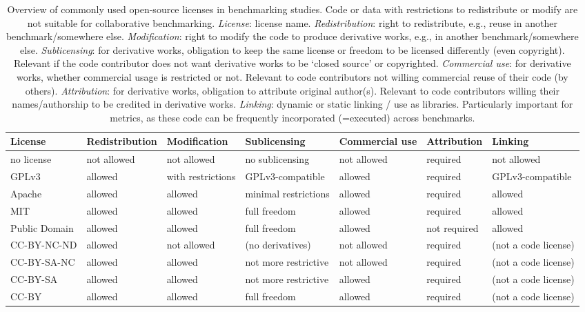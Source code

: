 \documentclass[11pt]{article}
\begin{document}
\begin{table}[]
    \caption[Overview of commonly-used open-source licenses in benchmarking studies.]{Overview of commonly used open-source licenses in benchmarking studies. Code or data with restrictions to redistribute or modify are not suitable for collaborative benchmarking. \emph{License}: license name. \emph{Redistribution}: right to redistribute, e.g., reuse in another benchmark/somewhere else. \emph{Modification}: right to modify the code to produce derivative works, e.g., in another benchmark/somewhere else. \emph{Sublicensing}: for derivative works, obligation to keep the same license or freedom to be licensed differently (even copyright). Relevant if the code contributor does not want derivative works to be `closed source' or copyrighted. \emph{Commercial use}: for derivative works, whether commercial usage is restricted or not. Relevant to code contributors not willing commercial reuse of their code (by others). \emph{Attribution}: for derivative works, obligation to attribute original author(s). Relevant to code contributors willing their names/authorship to be credited in derivative works. \emph{Linking}: dynamic or static linking / use as libraries. Particularly important for metrics, as these code can be frequently incorporated (=executed) across benchmarks. }
    \vspace{0.5cm}
    \centering
    \begin{adjustbox}{max width=\textwidth}
    \begin{tabular}{|l|l|l|l|l|l|l|}
    \hline
    License       &  Redistribution       &   Modification   & Sublicensing  & Commercial use & Attribution    & Linking   \\ \hline
    no license	& not allowed	& not allowed	& no sublicensing	& not allowed	& required	& not allowed	 \\
    GPLv3 &   	allowed	 & with restrictions	& GPLv3-compatible	& allowed	& required	& GPLv3-compatible \\
    Apache &	allowed &	allowed	& minimal restrictions	& allowed	& required	& allowed \\
    MIT	& allowed	& allowed	& full freedom	& allowed	& required	& allowed	 \\
    Public Domain	& allowed	& allowed	& full freedom	& allowed	& not required	& allowed  \\
    \textsc{CC-BY-NC-ND}	& allowed	& not allowed&	(no derivatives)	& not allowed	& required &	(not a code license)	 \\
    \textsc{CC-BY-SA-NC}	& allowed	& allowed	& not more restrictive& 	not allowed &	required	& (not a code license)	 \\
    \textsc{CC-BY-SA}	& allowed	& allowed	& not more restrictive &	allowed	& required&	(not a code license)  \\
    \textsc{CC-BY} &	allowed	& allowed	& full freedom 	& allowed& 	required&	(not a code license) \\ \hline

    \end{tabular}
    \end{adjustbox}
    \label{tab:licenses}
\end{table}
\end{document}
